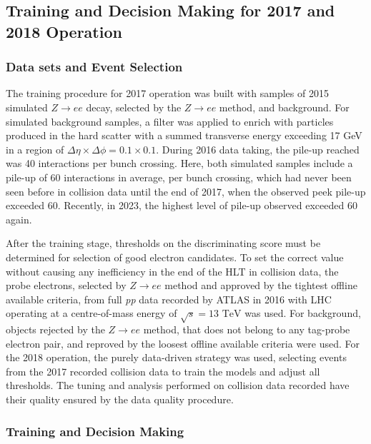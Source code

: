\subsection{Training and Decision Making for 2017 and 2018 Operation}%
\label{sec:tuning}

\subsubsection{Data sets and Event Selection}%
\label{ssec:dataset}

The training procedure for 2017 operation was built with samples of 2015 simulated $Z\rightarrow ee$ decay, selected by the $Z\rightarrow ee$ \TnP method\cite{aad2020performance}, and background. For simulated background samples, a filter was applied to enrich with particles produced in the hard scatter with a summed transverse energy exceeding 17 GeV in a region of $\Delta\eta\times\Delta\phi=0.1\times0.1$. During 2016 data taking, the pile-up reached was 40 interactions per bunch crossing.
Here, both simulated samples include a pile-up of 60 interactions in average, per bunch crossing, which had never been seen before in collision data until the end of 2017, when the observed peek pile-up exceeded 60. Recently, in 2023, the highest level of pile-up observed exceeded 60 again.

After the training stage, thresholds on the discriminating score must be determined for selection of good electron candidates. To set the correct value without causing any inefficiency in the end of the HLT in collision data, the probe electrons, selected by $Z\rightarrow ee$ \TnP method and approved by the tightest offline available criteria, from full \textit{pp} data recorded by ATLAS in 2016 with LHC operating at a centre-of-mass energy of $\sqrt{s}=13\text{ TeV}$ was used. For background, objects rejected by the $Z\rightarrow ee$ \TnP method, that does not belong to any tag-probe electron pair, and reproved by the loosest offline available criteria were used. For the 2018 operation, the purely data-driven strategy was used, selecting events from the 2017 recorded collision data to train the models and adjust all thresholds. The tuning and analysis performed on collision data recorded have their quality ensured by the data quality procedure. 


\subsubsection{Training and Decision Making}%

